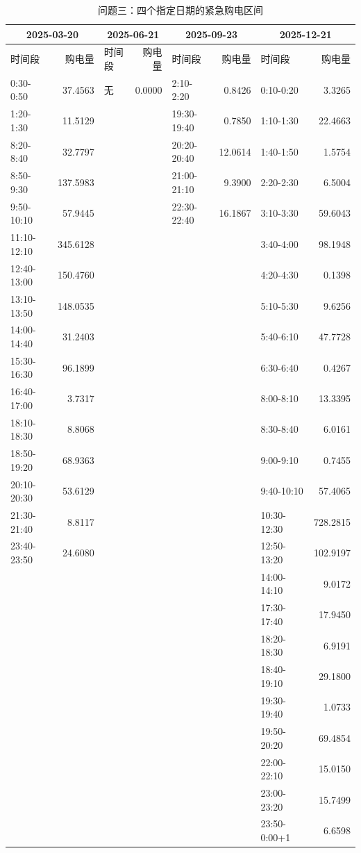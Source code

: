 \begin{table}[H]\centering\caption{问题三：四个指定日期的紧急购电区间}\label{tab:emergency-问题三}\fontsize{9}{11}\selectfont\setlength{\tabcolsep}{2pt}\begin{tabular}{|lr|lr|lr|lr|}\hline
\multicolumn{2}{|c|}{2025-03-20} & \multicolumn{2}{|c|}{2025-06-21} & \multicolumn{2}{|c|}{2025-09-23} & \multicolumn{2}{|c|}{2025-12-21}\\\hline
时间段&购电量&时间段&购电量&时间段&购电量&时间段&购电量\\\hline
0:30-0:50 & 37.4563 & 无 & 0.0000 & 2:10-2:20 & 0.8426 & 0:10-0:20 & 3.3265\\
1:20-1:30 & 11.5129 &  &  & 19:30-19:40 & 0.7850 & 1:10-1:30 & 22.4663\\
8:20-8:40 & 32.7797 &  &  & 20:20-20:40 & 12.0614 & 1:40-1:50 & 1.5754\\
8:50-9:30 & 137.5983 &  &  & 21:00-21:10 & 9.3900 & 2:20-2:30 & 6.5004\\
9:50-10:10 & 57.9445 &  &  & 22:30-22:40 & 16.1867 & 3:10-3:30 & 59.6043\\
11:10-12:10 & 345.6128 &  &  &  &  & 3:40-4:00 & 98.1948\\
12:40-13:00 & 150.4760 &  &  &  &  & 4:20-4:30 & 0.1398\\
13:10-13:50 & 148.0535 &  &  &  &  & 5:10-5:30 & 9.6256\\
14:00-14:40 & 31.2403 &  &  &  &  & 5:40-6:10 & 47.7728\\
15:30-16:30 & 96.1899 &  &  &  &  & 6:30-6:40 & 0.4267\\
16:40-17:00 & 3.7317 &  &  &  &  & 8:00-8:10 & 13.3395\\
18:10-18:30 & 8.8068 &  &  &  &  & 8:30-8:40 & 6.0161\\
18:50-19:20 & 68.9363 &  &  &  &  & 9:00-9:10 & 0.7455\\
20:10-20:30 & 53.6129 &  &  &  &  & 9:40-10:10 & 57.4065\\
21:30-21:40 & 8.8117 &  &  &  &  & 10:30-12:30 & 728.2815\\
23:40-23:50 & 24.6080 &  &  &  &  & 12:50-13:20 & 102.9197\\
 &  &  &  &  &  & 14:00-14:10 & 9.0172\\
 &  &  &  &  &  & 17:30-17:40 & 17.9450\\
 &  &  &  &  &  & 18:20-18:30 & 6.9191\\
 &  &  &  &  &  & 18:40-19:10 & 29.1800\\
 &  &  &  &  &  & 19:30-19:40 & 1.0733\\
 &  &  &  &  &  & 19:50-20:20 & 69.4854\\
 &  &  &  &  &  & 22:00-22:10 & 15.0150\\
 &  &  &  &  &  & 23:00-23:20 & 15.7499\\
 &  &  &  &  &  & 23:50-0:00+1 & 6.6598\\
\hline\end{tabular}\end{table}

